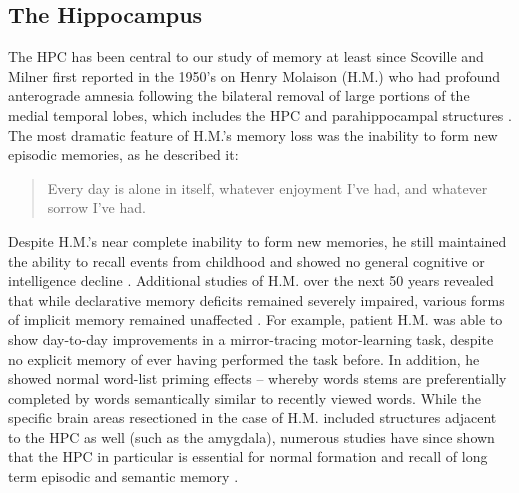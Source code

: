 \subsection{The Hippocampus}\label{sec:intro:memory:hpc}
The \ac{HPC} has been central to our study of memory at least since Scoville and Milner first reported in the 1950's on Henry Molaison (H.M.) who had profound anterograde amnesia following the bilateral removal of large portions of the medial temporal lobes, which includes the \ac{HPC} and parahippocampal structures \citep{Scoville1957}.
The most dramatic feature of H.M.'s memory loss was the inability to form new episodic memories, as he described it:
\begin{quote}
Every day is alone in itself, whatever enjoyment I've had, and whatever sorrow I've had.
\end{quote}
Despite H.M.'s near complete inability to form new memories, he still maintained the ability to recall events from childhood and showed no general cognitive or intelligence decline \citep{Squire2009}.
Additional studies of H.M. over the next 50 years revealed that while declarative memory deficits remained severely impaired, various forms of implicit memory remained unaffected \citep{Corkin2002}.
For example, patient H.M. was able to show day-to-day improvements in a mirror-tracing motor-learning task, despite no explicit memory of ever having performed the task before.
In addition, he showed normal word-list priming effects -- whereby words stems are preferentially completed by words semantically similar to recently viewed words. 
While the specific brain areas resectioned in the case of H.M. included structures adjacent to the \ac{HPC} as well (such as the amygdala), numerous studies have since shown that the \ac{HPC} in particular is essential for normal formation and recall of long term episodic and semantic memory \citep[reviewd in][]{Eichenbaum2000, Burgess2002}.

